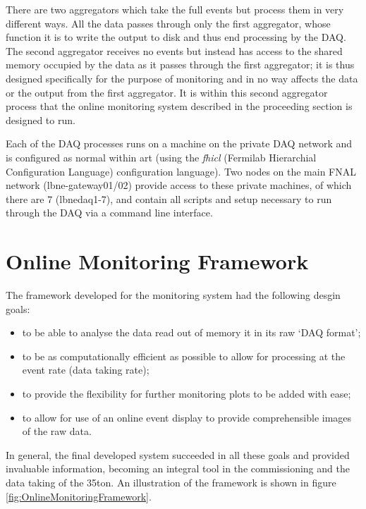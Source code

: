 There are two aggregators which take the full events but process them in very different ways.  All the data passes through only the first aggregator, whose function it is to write the output to disk and thus end processing by the DAQ.  The second aggregator receives no events but instead has access to the shared memory occupied by the data as it passes through the first aggregator; it is thus designed specifically for the purpose of monitoring and in no way affects the data or the output from the first aggregator.  It is within this second aggregator process that the online monitoring system described in the proceeding section is designed to run.

Each of the DAQ processes runs on a machine on the private DAQ network and is configured as normal within art (using the \textit{fhicl} (Fermilab Hierarchial Configuration Language) configuration language).  Two nodes on the main FNAL network (lbne-gateway01/02) provide access to these private machines, of which there are 7 (lbnedaq1-7), and contain all scripts and setup necessary to run through the DAQ via a command line interface.

\section{Online Monitoring Framework}\label{sec:OnlineMonitoring}

The framework developed for the monitoring system had the following desgin goals:

\begin{itemize}
\item to be able to analyse the data read out of memory it in its raw `DAQ format';
\item to be as computationally efficient as possible to allow for processing at the event rate (data taking rate);
\item to provide the flexibility for further monitoring plots to be added with ease;
\item to allow for use of an online event display to provide comprehensible images of the raw data.
\end{itemize}

In general, the final developed system succeeded in all these goals and provided invaluable information, becoming an integral tool in the commissioning and the data taking of the 35ton.  An illustration of the framework is shown in figure \ref{fig:OnlineMonitoringFramework}.

